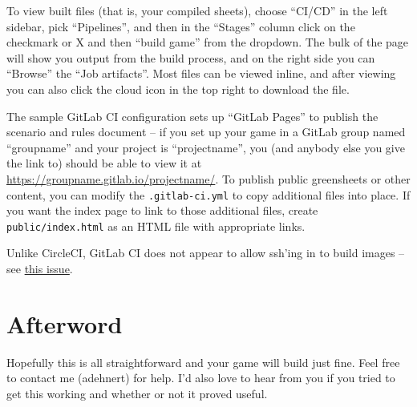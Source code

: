 \documentclass[green]{testgame}
\begin{document}
To view built files (that is, your compiled sheets), choose ``CI/CD'' in the left sidebar, pick ``Pipelines'', and then in the ``Stages'' column click on the checkmark or X and then ``build game'' from the dropdown. The bulk of the page will show you output from the build process, and on the right side you can ``Browse'' the ``Job artifacts''. Most files can be viewed inline, and after viewing you can also click the cloud icon in the top right to download the file.

The sample GitLab CI configuration sets up ``GitLab Pages'' to publish the scenario and rules document -- if you set up your game in a GitLab group named ``groupname'' and your project is ``projectname'', you (and anybody else you give the link to) should be able to view it at \url{https://groupname.gitlab.io/projectname/}. To publish public greensheets or other content, you can modify the \texttt{.gitlab-ci.yml} to copy additional files into place. If you want the index page to link to those additional files, create \texttt{public/index.html} as an HTML file with appropriate links.

Unlike CircleCI, GitLab CI does not appear to allow ssh'ing in to build images -- see \href{https://gitlab.com/gitlab-org/gitlab-ce/issues/22319}{this issue}.

\section{Afterword}

Hopefully this is all straightforward and your game will build just fine. Feel free to contact me (adehnert) for help. I'd also love to hear from you if you tried to get this working and whether or not it proved useful.
\end{document}
